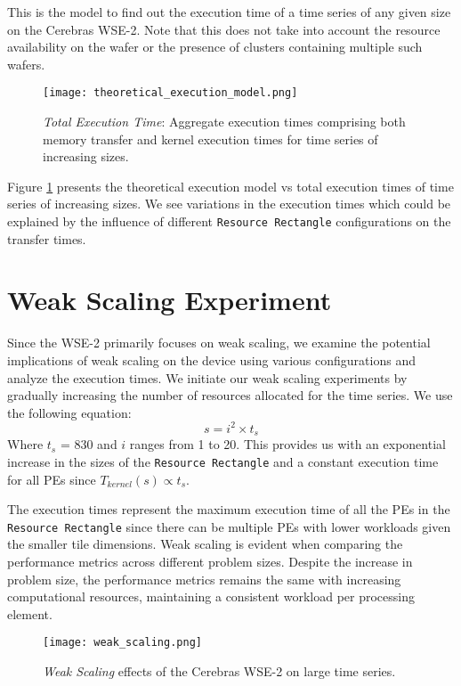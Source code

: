 This is the model to find out the execution time of a time series of any given size on the Cerebras WSE-2. Note that this does not take into account the resource availability on the wafer or the presence of clusters containing multiple such wafers.

\begin{figure}[h!]
    \texttt{[image: theoretical\_execution\_model.png]}
    \centering
    \caption{\textit{Total Execution Time}: Aggregate execution times comprising both memory transfer and kernel execution times for time series of increasing sizes.}
    \label{fig:theoretical_execution_model}
\end{figure}

Figure \ref{fig:theoretical_execution_model} presents the theoretical execution model vs total execution times of time series of increasing sizes. We see variations in the execution times which could be explained by the influence of different \texttt{Resource Rectangle} configurations on the transfer times.

\section{Weak Scaling Experiment} \label{section:weak_scaling}

Since the WSE-2 primarily focuses on weak scaling, we examine the potential implications of weak scaling on the device using various configurations and analyze the execution times. We initiate our weak scaling experiments by gradually increasing the number of resources allocated for the time series. We use the following equation: \[ s = i^2 \times t_s \] Where \( t_s \) = 830 and \( i \) ranges from 1 to 20. This provides us with an exponential increase in the sizes of the \texttt{Resource Rectangle} and a constant execution time for all PEs since \( T_{kernel}(s) \propto t_s \).

The execution times represent the maximum execution time of all the PEs in the \texttt{Resource Rectangle} since there can be multiple PEs with lower workloads given the smaller tile dimensions. Weak scaling is evident when comparing the performance metrics across different problem sizes. Despite the increase in problem size, the performance metrics remains the same with increasing computational resources, maintaining a consistent workload per processing element.

\begin{figure}[h!]
    \texttt{[image: weak\_scaling.png]}
    \centering
    \caption{\textit{Weak Scaling} effects of the Cerebras WSE-2 on large time series.}
    \label{fig:weak_scaling}
\end{figure}

